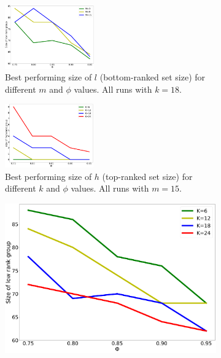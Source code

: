 \documentclass[letterpaper]{article} %
\begin{document}
\begin{figure}
\centering
\begin{subfigure}{0.24\textwidth}
\includegraphics[width=\textwidth,height=1.08in ]{"./images/percentage_of_low_rank_group_for_num_of_winners_with_phi_new_new.png"}
\caption{Best performing size of $l$ (bottom-ranked set size) for different $m$ and $\phi$ values. All runs with $k = 18$.}
\label{fig:percentage_of_low_rank_group_for_num_of_winners}
\end{subfigure}
\hfill
\begin{subfigure}{0.24\textwidth}
\includegraphics[width=\textwidth,height=1.08in ]{"./images/size_of_high_rank_group_for_num_of_reviews_with_phi_new_new.png"}
\caption{Best performing size of $h$ (top-ranked set size) for different $k$ and $\phi$ values. All runs with $m = 15$.}
\label{fig:size_of_high_rankk_group_for_num_of_reviews}
\end{subfigure}
\hfill
\vspace{-3.01mm}
\begin{subfigure}{0.24\textwidth}
\includegraphics[width=\textwidth]{"./images/percentage_of_low_rank_group_for_num_of_reviews_with_phi_new_new.png"}

\end{subfigure}
\end{figure}
\end{document}
